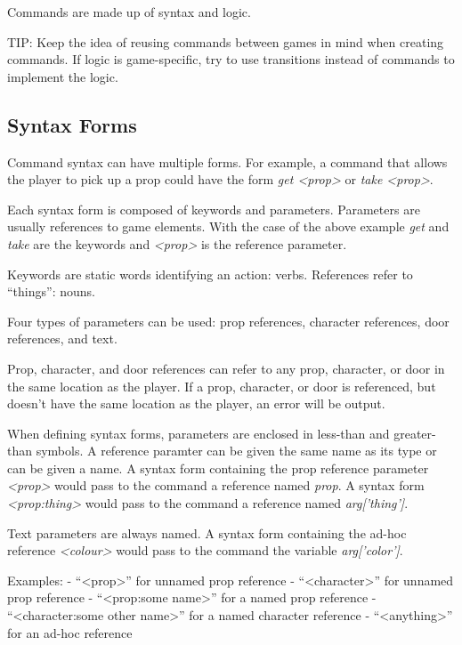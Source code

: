 \documentclass[letterpaper,10pt,english]{sphinxmanual}
\begin{document}
Commands are made up of syntax and logic.

TIP: Keep the idea of reusing commands between games in mind when creating commands. If logic is game-specific, try to use transitions instead of commands to implement the logic.


\subsection{Syntax Forms}
\label{manipulation:syntax-forms}
Command syntax can have multiple forms. For example, a command that allows the player to pick up a prop could have the form \emph{get \textless{}prop\textgreater{}} or \emph{take \textless{}prop\textgreater{}}.

Each syntax form is composed of keywords and parameters. Parameters are usually references to game elements. With the case of the above example \emph{get} and \emph{take} are the keywords and \emph{\textless{}prop\textgreater{}} is the reference parameter.

Keywords are static words identifying an action: verbs. References refer to ``things'': nouns.

Four types of parameters can be used: prop references, character references, door references, and text.

Prop, character, and door references can refer to any prop, character, or door in the same location as the player. If a prop, character, or door is referenced, but doesn't have the same location as the player, an error will be output.

When defining syntax forms, parameters are enclosed in less-than and greater-than symbols. A reference paramter can be given the same name as its type or can be given a name. A syntax form containing the prop reference parameter \emph{\textless{}prop\textgreater{}} would pass to the command a reference named \emph{prop}. A syntax form \emph{\textless{}prop:thing\textgreater{}} would pass to the command a reference named \emph{arg{[}'thing'{]}}.

Text parameters are always named. A syntax form containing the ad-hoc reference \emph{\textless{}colour\textgreater{}} would pass to the command the variable \emph{arg{[}'color'{]}}.

Examples:
- ``\textless{}prop\textgreater{}'' for unnamed prop reference
- ``\textless{}character\textgreater{}'' for unnamed prop reference
- ``\textless{}prop:some name\textgreater{}'' for a named prop reference
- ``\textless{}character:some other name\textgreater{}'' for a named character reference
- ``\textless{}anything\textgreater{}'' for an ad-hoc reference
\end{document}

